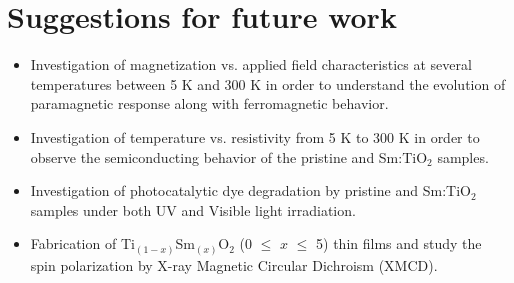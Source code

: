 \documentclass[main.tex]{subfiles}
\begin{document}
\chapter{Suggestions for future work}

\thispagestyle{empty}

\pagestyle{fancy}
\fancyhf{}

\lhead{\chaptername \ \thechapter}

\begin{itemize}
	\item Investigation of magnetization vs. applied field characteristics at several temperatures between 5 K and 300 K in order to understand the evolution of paramagnetic response along with ferromagnetic behavior.\\

	\item Investigation of temperature vs. resistivity from 5 K to 300 K in order to observe the semiconducting behavior of the pristine and Sm:TiO$_{2}$ samples.\\

	\item Investigation of photocatalytic dye degradation by pristine and Sm:TiO$_{2}$ samples under both UV and Visible light irradiation.\\

	\item Fabrication of Ti$_{(1-x)}$Sm$_{(x)}$O$_{2}$ (0 $\leq$ $x$ $\leq$ 5) thin films and study the spin polarization by X-ray Magnetic Circular Dichroism (XMCD).
	
\end{itemize}
\FloatBarrier


\thispagestyle{fancy}
\end{document}
